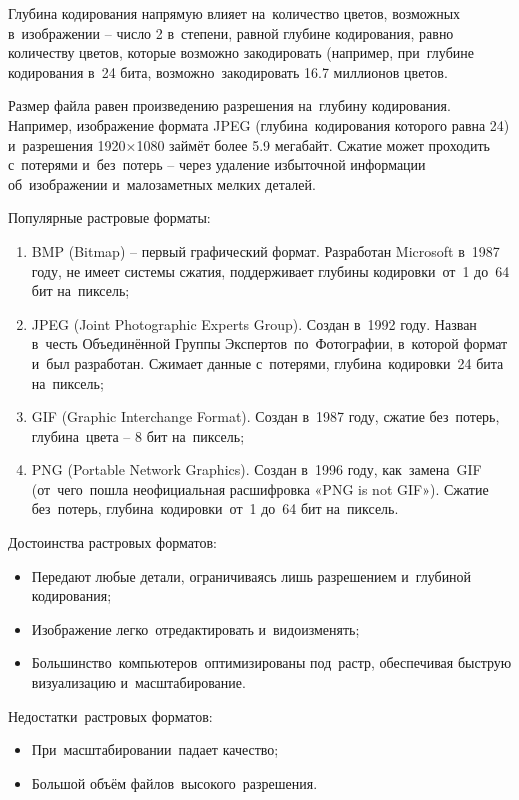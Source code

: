 \documentclass{ou}
\begin{document}
Глубина кодирования напрямую влияет на~количество цветов, возможных в~изображении -- число 2 в~степени, равной глубине кодирования, равно количеству цветов, которые возможно закодировать (например, при~глубине кодирования в~24 бита, возможно~закодировать 16.7 миллионов цветов.

Размер файла равен произведению разрешения на~глубину кодирования. Например, изображение формата JPEG (глубина~кодирования которого равна 24) и~разрешения 1920×1080 займёт более 5.9 мегабайт. Сжатие может проходить с~потерями и~без~потерь -- через удаление избыточной информации об~изображении и~малозаметных мелких деталей.

Популярные растровые форматы: 
\begin{enumerate}[leftmargin=0em, itemindent=3.75em, nosep, label=\arabic*)]
\item BMP (Bitmap) -- первый графический формат. Разработан Microsoft в~1987 году, не имеет системы сжатия, поддерживает глубины кодировки~от~1 до~64 бит на~пиксель;
\item JPEG (Joint Photographic Experts Group). Создан в~1992 году. Назван в~честь Объединённой Группы Экспертов~по~Фотографии, в~которой формат и~был разработан. Сжимает данные с~потерями, глубина~кодировки~24 бита на~пиксель;
\item GIF (Graphic Interchange Format). Создан в~1987 году, сжатие без~потерь, глубина~цвета -- 8 бит на~пиксель;
\item PNG (Portable Network Graphics). Создан в~1996 году, как~замена~GIF (от~чего~пошла неофициальная расшифровка «PNG is not GIF»). Сжатие без~потерь, глубина~кодировки~от~1 до~64 бит на~пиксель.
\end{enumerate}

Достоинства растровых форматов:
\begin{itemize}[label=-, leftmargin=0em, itemindent=3.35em, nosep]
\item Передают любые детали, ограничиваясь лишь разрешением и~глубиной кодирования;
\item Изображение легко~отредактировать и~видоизменять;
\item Большинство~компьютеров~оптимизированы под~растр, обеспечивая быструю визуализацию и~масштабирование.
\end{itemize}

Недостатки~растровых форматов:
\begin{itemize}[label=-, leftmargin=0em, itemindent=3.35em, nosep]
\item При~масштабировании~падает качество;
\item Большой объём файлов~высокого~разрешения.
\end{itemize}
\end{document}
